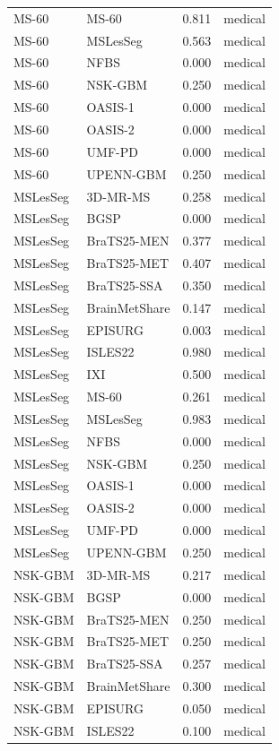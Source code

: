 \begin{tabular}{llrl}
MS-60 & MS-60 & 0.811 & medical \\
MS-60 & MSLesSeg & 0.563 & medical \\
MS-60 & NFBS & 0.000 & medical \\
MS-60 & NSK-GBM & 0.250 & medical \\
MS-60 & OASIS-1 & 0.000 & medical \\
MS-60 & OASIS-2 & 0.000 & medical \\
MS-60 & UMF-PD & 0.000 & medical \\
MS-60 & UPENN-GBM & 0.250 & medical \\
MSLesSeg & 3D-MR-MS & 0.258 & medical \\
MSLesSeg & BGSP & 0.000 & medical \\
MSLesSeg & BraTS25-MEN & 0.377 & medical \\
MSLesSeg & BraTS25-MET & 0.407 & medical \\
MSLesSeg & BraTS25-SSA & 0.350 & medical \\
MSLesSeg & BrainMetShare & 0.147 & medical \\
MSLesSeg & EPISURG & 0.003 & medical \\
MSLesSeg & ISLES22 & 0.980 & medical \\
MSLesSeg & IXI & 0.500 & medical \\
MSLesSeg & MS-60 & 0.261 & medical \\
MSLesSeg & MSLesSeg & 0.983 & medical \\
MSLesSeg & NFBS & 0.000 & medical \\
MSLesSeg & NSK-GBM & 0.250 & medical \\
MSLesSeg & OASIS-1 & 0.000 & medical \\
MSLesSeg & OASIS-2 & 0.000 & medical \\
MSLesSeg & UMF-PD & 0.000 & medical \\
MSLesSeg & UPENN-GBM & 0.250 & medical \\
NSK-GBM & 3D-MR-MS & 0.217 & medical \\
NSK-GBM & BGSP & 0.000 & medical \\
NSK-GBM & BraTS25-MEN & 0.250 & medical \\
NSK-GBM & BraTS25-MET & 0.250 & medical \\
NSK-GBM & BraTS25-SSA & 0.257 & medical \\
NSK-GBM & BrainMetShare & 0.300 & medical \\
NSK-GBM & EPISURG & 0.050 & medical \\
NSK-GBM & ISLES22 & 0.100 & medical \\

\end{tabular}
